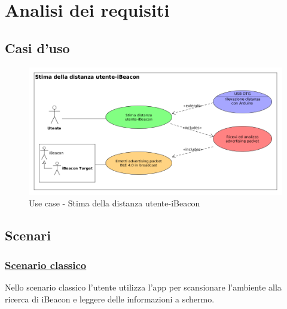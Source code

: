 
\section{Analisi dei requisiti}
\subsection{Casi d'uso}
\begin{figure}[ph]
	\centering
	\includegraphics[scale=.45]{img/uml/use_case/use_case1}
	\caption[Use case - Stima della distanza utente-iBeacon]{Use case - Stima della distanza utente-iBeacon}
	\label{fig:usecase}
\end{figure}

\subsection{Scenari}

\subsubsection{\underline{Scenario classico}}
Nello scenario classico l'utente utilizza l'app per scansionare l'ambiente alla ricerca di iBeacon e leggere delle informazioni a schermo.

